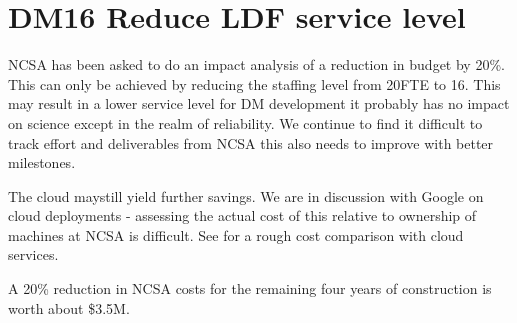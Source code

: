 \section{DM16 Reduce LDF service level}\label{sect:dm16}

NCSA has been  asked to do an impact analysis of a reduction in budget by 20\%. This
can only be achieved by reducing the staffing level from 20FTE to 16.
This may result in a lower service level for DM development it probably has no impact on science except in the realm of reliability.
We continue to find it difficult to track effort and deliverables from NCSA this also needs to improve with better milestones.

The cloud  maystill yield further savings.
We are in discussion with Google on cloud deployments - assessing the actual cost of this relative to ownership of machines at NCSA is difficult.
    See   for a rough cost comparison with cloud services.


A 20\% reduction in NCSA costs for the remaining four years of construction is worth about \$3.5M.

